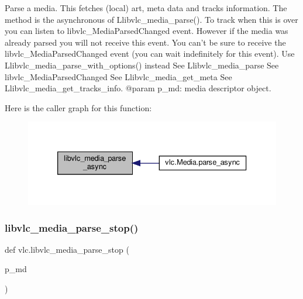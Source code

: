\begin{DoxyVerb}Parse a media.
This fetches (local) art, meta data and tracks information.
The method is the asynchronous of L{libvlc_media_parse}().
To track when this is over you can listen to libvlc_MediaParsedChanged
event. However if the media was already parsed you will not receive this
event.
\deprecated You can't be sure to receive the libvlc_MediaParsedChanged
            event (you can wait indefinitely for this event).
            Use L{libvlc_media_parse_with_options}() instead
See L{libvlc_media_parse}
See libvlc_MediaParsedChanged
See L{libvlc_media_get_meta}
See L{libvlc_media_get_tracks_info}.
@param p_md: media descriptor object.
\end{DoxyVerb}
 Here is the caller graph for this function\+:
\nopagebreak
\begin{figure}[H]
\begin{center}
\leavevmode
\includegraphics[width=333pt]{namespacevlc_a37423ae6fdd1861b4823c167ec4662d1_icgraph}
\end{center}
\end{figure}
\mbox{\label{namespacevlc_ad065972236e02109d2814383f5dfaaf8}} 
\subsubsection{\texorpdfstring{libvlc\+\_\+media\+\_\+parse\+\_\+stop()}{libvlc\_media\_parse\_stop()}}
{\footnotesize\ttfamily def vlc.\+libvlc\+\_\+media\+\_\+parse\+\_\+stop (\begin{DoxyParamCaption}\item[{}]{p\+\_\+md }\end{DoxyParamCaption})}

